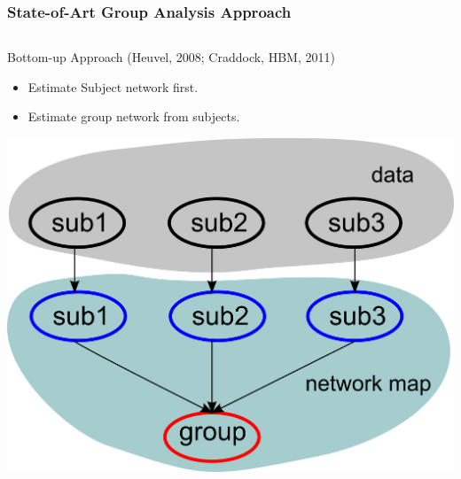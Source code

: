 \documentclass[serif]{beamer}
\begin{document}
\begin{frame}
\frametitle{State-of-Art Group Analysis Approach}
\vspace{-10pt}
\begin{columns}[t]
  \begin{column}{5.5cm}
    \begin{block}{Bottom-up Approach (Heuvel, 2008; Craddock, HBM, 2011)}
      \begin{itemize}
        \item Estimate Subject network first.
        \item Estimate group network from subjects.
      \end{itemize}
    \end{block}
    \includegraphics[width=\textwidth]{sfig/hier1}
  \end{column}


\end{columns}
\end{frame}
\end{document}
